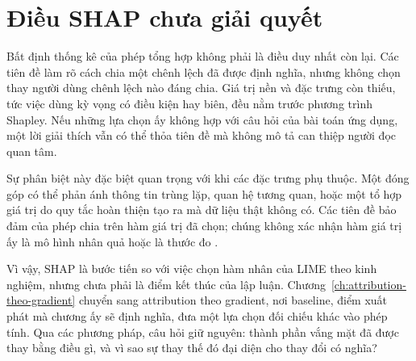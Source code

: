 \section{Điều SHAP chưa giải quyết}
\label{sec:ch04-dieu-shap-chua-giai-quyet}

Bất định thống kê của phép tổng hợp không phải là điều duy nhất còn lại. Các
tiên đề làm rõ cách chia một chênh lệch đã được định nghĩa, nhưng không
chọn thay người dùng chênh lệch nào đáng chia. Giá trị nền và
 đặc trưng còn thiếu, tức việc dùng kỳ
vọng có điều kiện hay biên, đều nằm trước phương trình Shapley. Nếu những lựa chọn ấy không hợp với câu hỏi của bài toán
ứng dụng, một lời giải thích vẫn có thể thỏa tiên đề mà không mô tả can thiệp
người đọc quan tâm.

Sự phân biệt này đặc biệt quan trọng với 
khi các đặc trưng phụ thuộc. Một đóng góp có thể phản ánh thông tin trùng lặp,
quan hệ tương quan, hoặc một tổ hợp giá trị do quy tắc hoàn thiện tạo ra mà dữ
liệu thật không có. Các tiên đề bảo đảm  của phép chia trên hàm giá trị đã
chọn; chúng không xác nhận hàm giá trị ấy là mô hình nhân quả hoặc là thước đo
.

Vì vậy, SHAP là bước tiến so với việc chọn hàm nhân của LIME theo kinh nghiệm, nhưng chưa
phải là điểm kết thúc của lập luận. Chương~\ref{ch:attribution-theo-gradient}
chuyển sang attribution theo gradient, nơi baseline, điểm xuất phát mà chương
ấy sẽ định nghĩa, đưa một lựa chọn đối chiếu khác vào phép tính. Qua các phương pháp, câu hỏi giữ
nguyên: thành phần vắng mặt đã được thay bằng điều gì, và vì sao sự thay thế đó
đại diện cho thay đổi có nghĩa?

%
